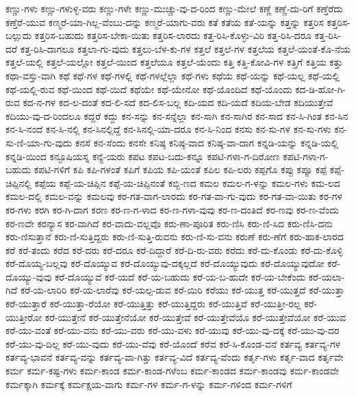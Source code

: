 {ಕಣ್ಣು-ಗಳು
ಕಣ್ಣು-ಗಳುಳ್ಳ-ವರು
ಕಣ್ಣು-ಗಳೇ
ಕಣ್ಣು-ಮುಚ್ಚು-ವು-ದ-ರಿಂದ
ಕಣ್ಣು-ಮೇಲೆ
ಕಣ್ಣೆ
ಕಣ್ಣೆ-ದು-ರಿಗೆ
ಕಣ್ತೆರೆದು
ಕಣ್ತೆರೆ-ಯುವ
ಕಣ್ಮರೆ-ಯಾ-ಗಿಲ್ಲ-ವೆಂಬು-ದನ್ನು
ಕಣ್ಮರೆ-ಯಾಗು-ವರು
ಕತೆ
ಕತೆಯ
ಕತೆ-ಯನ್ನು
ಕತ್ತನ್ನು
ಕತ್ತರಿಸ
ಕತ್ತರಿಸ-ಬಲ್ಲುದು
ಕತ್ತರಿಸ-ಬಹುದು
ಕತ್ತರಿಸ-ಬೇಕಾ-ಯಿತು
ಕತ್ತರಿಸ-ಲಾರದು
ಕತ್ತ-ರಿಸಿ-ಕೊಳ್ಳು-ವಿರಿ
ಕತ್ತ-ರಿಸಿ-ದರೂ
ಕತ್ತ-ರಿಸಿ-ದರೆ
ಕತ್ತ-ರಿಸಿ-ದಾಗಲೂ
ಕತ್ತಲಾ-ಗು-ವುದು
ಕತ್ತಲು-ಬೆಳ-ಕು-ಗಳ
ಕತ್ತಲೆ
ಕತ್ತಲೆ-ಗಳ
ಕತ್ತಲೆಯ
ಕತ್ತಲೆ-ಯಂತೆ-ಕೊ-ನೆಯ
ಕತ್ತಲೆ-ಯಲ್ಲಿ
ಕತ್ತಲೆ-ಯಲ್ಲೋ
ಕತ್ತಲೆ-ಯಿಂದ
ಕತ್ತಲೆಯೂ
ಕತ್ತಲೆ-ಯೆಂದು
ಕತ್ತಿ
ಕತ್ತಿ-ಕೋವಿ-ಗಳ
ಕತ್ತಿಗೆ
ಕತ್ತಿಯ
ಕತ್ತು
ಕಥಾ-ವಸ್ತು-ವಾಗಿ
ಕಥೆ
ಕಥೆ-ಗಳ
ಕಥೆ-ಗಳಲ್ಲಿ
ಕಥೆ-ಗಳಲ್ಲೆಲ್ಲಾ
ಕಥೆ-ಗಳು
ಕಥೆಯ
ಕಥೆ-ಯನ್ನು
ಕಥೆ-ಯಲ್ಲ
ಕಥೆ-ಯಲ್ಲಿ
ಕಥೆ-ಯಲ್ಲಿ-ರುವ
ಕಥೆ-ಯಿಂದ
ಕಥೆ-ಯಿದೆ
ಕಥೆಯೇ
ಕಥೆ-ಯೇನೋ
ಕಥೆ-ಯೊಂದಿದೆ
ಕಥೆ-ಯೊಂದು
ಕದ-ಡಿ-ಹೋ-ಗಿ-ರುವ
ಕದ-ನ-ಗಳ
ಕದ-ಲ-ದಂತೆ
ಕದ-ಲಿ-ಸದೆ
ಕದ-ಲಿಸ-ಬಲ್ಲ
ಕದಿ-ಯದ
ಕದಿ-ಯದೆ
ಕದಿಯ-ಬೇಡ
ಕದಿಯುತ್ತೇವೆ
ಕದಿಯು-ವು-ದ-ರಿಂದಲೂ
ಕದ್ದರೆ
ಕದ್ದು
ಕನ-ಸನ್ನು
ಕನ-ಸನ್ನೆಲ್ಲಾ
ಕನ-ಸಾಗಿ
ಕನ-ಸಾಗಿರ
ಕನ-ಸಾದ
ಕನ-ಸಿ-ಗಿಂತ
ಕನ-ಸಿನ
ಕನ-ಸಿ-ನಂದೆ
ಕನ-ಸಿ-ನಲ್ಲಿ
ಕನ-ಸಿನಲ್ಲಿದ್ದೆ
ಕನ-ಸಿನಲ್ಲಿ-ಯಾ-ದರೂ
ಕನ-ಸಿ-ನಿಂದ
ಕನಸು
ಕನ-ಸು-ಗಳ
ಕನ-ಸು-ಗಳು
ಕನ-ಸು-ಣಿ-ಯಾ-ಗು-ವುದು
ಕನಸೆ
ಕನ-ಸೆಂದು
ಕನಸೇ
ಕನಿಷ್ಠ
ಕನಿಷ್ಠ-ವಾದ
ಕನಿಷ್ಠ-ವಾ-ದಾಗ
ಕನ್ನಡಿ-ಯನ್ನು
ಕನ್ನಡಿ-ಯಲ್ಲಿ
ಕನ್ನಡಿ-ಯಿಂದ
ಕನ್ಫೂಷಿಯಸ್ನ
ಕನ್ಯೆ-ಯರು
ಕಪಟ
ಕಪಟ-ಬದು-ಕನ್ನೂ
ಕಪಟಿ-ಗಳಾ-ಗ-ದಿರೋಣ
ಕಪಟಿ-ಗಳಾ-ಗ-ಬಹುದು
ಕಪಟಿ-ಗಳಿಗೆ
ಕಪಿ
ಕಪಿ-ಗಳಂತೆ
ಕಪಿಗೆ
ಕಪಿಯ
ಕಪಿ-ಯಂತೆ
ಕಪಿಲ
ಕಪಿ-ಲರು
ಕಪ್ಪಗೊ
ಕಪ್ಪು
ಕಪ್ಪೂ
ಕಪ್ಪೆ
ಕಪ್ಪೆ-ಚಿಪ್ಪಿನಲ್ಲಿ
ಕಪ್ಪೆಯ
ಕಪ್ಪೆ-ಯ-ಚಿಪ್ಪಿನ
ಕಪ್ಪೆ-ಯ-ಚಿಪ್ಪಿನಂತೆ
ಕಬ್ಬಿ-ಣದ
ಕಮಲ
ಕಮಲ-ಗ-ಳನ್ನು
ಕಮಲ-ಗಳು
ಕಮ-ಲದ
ಕಮಲ-ದಲ್ಲಿ
ಕಮಲ-ವನ್ನು
ಕಮಲವು
ಕರ-ಗತ-ವಾಗ-ಲಾರದು
ಕರ-ಗತ-ವಾ-ಗು-ವುದು
ಕರ-ಗತ-ವಾ-ಯಿತು
ಕರ-ಗಳ
ಕರ-ಗಳು
ಕರಗಿ
ಕರ-ಗಿ-ದಾಗ
ಕರಣ
ಕರ-ಣ-ಗ-ಳಾದ
ಕರ-ಣ-ಗಳಾ-ವುವು
ಕರ-ಣ-ದಂತಿದೆ
ಕರ-ಣವು
ಕರ-ಣ-ವೆಂದು
ಕರ-ಣವೇ
ಕರನ್ಯಾಸ
ಕರ-ವಾಗಿದೆ
ಕರ-ವಾದು-ವಲ್ಲವೊ
ಕರು-ಣಾ-ಪೂರಿತ
ಕರು-ಣಿಸಿ
ಕರು-ಣಿ-ಸಿದ
ಕರು-ಣಿಸಿ-ದನು
ಕರು-ಣಿಸುತ್ತಾನೆ
ಕರು-ಣಿ-ಸುತ್ತಿದ್ದರು
ಕರು-ಣಿ-ಸುತ್ತಿ-ರುವನು
ಕರು-ಣಿ-ಸು-ವನು
ಕರುಣೆ
ಕರು-ಣೆಗೆ
ಕರು-ಹಾಕ-ಲಾರದ
ಕರೆ
ಕರೆ-ತಂದು
ಕರೆದ
ಕರೆ-ದರು
ಕರೆ-ದರೂ
ಕರೆ-ದಿದ್ದಾರೆ
ಕರೆ-ದಿ-ರು-ವರು
ಕರೆದು
ಕರೆ-ದು-ಕೊಂಡು
ಕರೆ-ದು-ಕೊಳ್ಳಿ
ಕರೆ-ದೊಯ್ಯ-ಬಲ್ಲವು
ಕರೆ-ದೊಯ್ಯುವ
ಕರೆ-ದೊಯ್ಯುವು-ದಕ್ಕಲ್ಲದೆ
ಕರೆ-ದೊಯ್ಯುವುದು
ಕರೆ-ದೊಯ್ಯುವುದೋ
ಕರೆ-ದೊಯ್ಯು-ವುವು
ಕರೆ-ದೊಯ್ಯುವೆ
ಕರೆ-ಯದೆ
ಕರೆ-ಯ-ಬಹುದು
ಕರೆ-ಯ-ಬ-ಹುದೇ
ಕರೆ-ಯ-ಬೇಕೆಂದು
ಕರೆ-ಯಲಾ-ಗಿದೆ
ಕರೆ-ಯ-ಲಾರಿರಿ
ಕರೆ-ಯ-ಲಾರೆವು
ಕರೆ-ಯಲ್ಪ-ಡುವ
ಕರೆ-ಯಿರಿ
ಕರೆಯು
ಕರೆ-ಯುತ್ತ
ಕರೆ-ಯುತ್ತದೆ
ಕರೆ-ಯುತ್ತಾ
ಕರೆ-ಯುತ್ತಾರೆ
ಕರೆ-ಯುತ್ತಾ-ರೆಯೋ
ಕರೆ-ಯುತ್ತಿತ್ತು
ಕರೆ-ಯುತ್ತಿದ್ದರು
ಕರೆ-ಯುತ್ತಿವೆ
ಕರೆ-ಯುತ್ತೀ-ರಲ್ಲ
ಕರೆ-ಯುತ್ತೀರೋ
ಕರೆ-ಯುತ್ತೇನೆ
ಕರೆ-ಯುತ್ತೇನೆಯೋ
ಕರೆ-ಯುತ್ತೇವೆ
ಕರೆ-ಯುತ್ತೇವೆಯೊ
ಕರೆ-ಯುತ್ತೇವೆಯೋ
ಕರೆ-ಯುವ
ಕರೆ-ಯು-ವಂತೆ
ಕರೆ-ಯು-ವನು
ಕರೆ-ಯು-ವರು
ಕರೆ-ಯು-ವಳು
ಕರೆ-ಯುವು
ಕರೆ-ಯು-ವು-ದಕ್ಕೆ
ಕರೆ-ಯು-ವು-ದರ
ಕರೆ-ಯು-ವು-ದಿಲ್ಲ
ಕರೆ-ಯು-ವುದು
ಕರೆ-ಯು-ವೆವು
ಕರೆ-ಯೊಂದೆ
ಕರೆವ
ಕರೆ-ಸಿ-ಕೊಂಡ-ವನೆ
ಕರ್ತವ್ಯ
ಕರ್ತವ್ಯ-ಗಳ
ಕರ್ತವ್ಯ-ಭಾವನೆ
ಕರ್ತವ್ಯ-ವನ್ನು
ಕರ್ತವ್ಯ-ವಾ-ಗಿತ್ತು
ಕರ್ತವ್ಯ-ವಿದೆ
ಕರ್ತವ್ಯ-ವೆಂದು
ಕರ್ತೃ-ಗಳು
ಕರ್ತೃ-ವಾದ
ಕರ್ತೃವೇ
ಕರ್ಮ
ಕರ್ಮ-ಕಷ್ಟ-ಗಳು
ಕರ್ಮ-ಕಾಂಡ
ಕರ್ಮ-ಕಾಂಡ-ಗಳೆಂಬ
ಕರ್ಮ-ಕಾಂಡದ
ಕರ್ಮ-ಕಾಂಡವು
ಕರ್ಮ-ಕಾಂಡವೇ
ಕರ್ಮಕ್ಕಾಗಿ
ಕರ್ಮಕ್ಕೆ
ಕರ್ಮಕ್ಷಯ-ವಾಗು
ಕರ್ಮ-ಗಳ
ಕರ್ಮ-ಗ-ಳನ್ನು
ಕರ್ಮ-ಗಳಿಂದ
ಕರ್ಮ-ಗಳಿಗೆ
}
